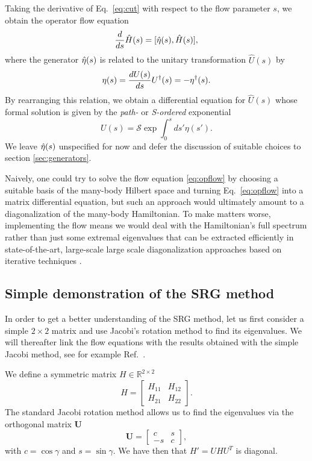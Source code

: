 Taking the derivative of Eq.~\eqref{eq:cut}
with respect to the flow parameter $s$, we obtain the operator flow equation
\begin{equation}\label{eq:opflow}
  \totd{}{s}\hat{H}(s) = \comm{\etaO(s)}{\hat{H}(s)},
\end{equation} 
where the generator $\hat{\eta}(s)$ is related to the unitary transformation $\hat{U}(s)$ by
\begin{equation}
  \eta(s)= \frac{d {U(s)}} {d {s}} U^{\dag}(s) = -\eta^{\dag}(s).
\end{equation}
By rearranging this relation, we obtain a differential equation for $\hat{U}(s)$ whose formal solution is given by the \emph{path-}
or \emph{S-ordered} exponential
\begin{equation}
  U(s) = \mathcal{S}\exp \int^s_0 ds' \eta(s').
\end{equation}
We leave $\hat{\eta}(s)$ unspecified for now and defer the discussion of suitable choices to section \ref{sec:generators}. 

Naively, one could try to solve the flow equation \eqref{eq:opflow} by
choosing a suitable basis of the many-body Hilbert space and turning
Eq.~\eqref{eq:opflow} into a matrix differential equation, but such an
approach would ultimately amount to a diagonalization of the many-body
Hamiltonian. To make matters worse, implementing the flow means we
would deal with the Hamiltonian's full spectrum rather than just some
extremal eigenvalues that can be extracted efficiently in
state-of-the-art, large-scale large scale diagonalization approaches based on iterative techniques
\cite{golubvaloan1996}.

\subsection{Simple demonstration of the SRG method}
In order to get a better understanding of the SRG method, let us first consider  
a simple $2\times 2$ matrix and use Jacobi's rotation method to find its eigenvalues. 
We will thereafter link the flow equations
with the results obtained with the simple Jacobi method, see for example Ref.~\cite{golubvanloan1996}.

We define a  symmetric matrix  $H\in {\mathbb{R}}^{2\times 2}$
\[ 
H = \begin{bmatrix} H_{11} & H_{12} \\ H_{21} & H_{22}\end{bmatrix}. 
\]
The standard Jacobi rotation method allows us to find the eigenvalues via the orthogonal matrix
$\mathbf{U}$ 
\[ 
\mathbf{U} = \begin{bmatrix} c & s \\ -s & c
\end{bmatrix}, 
\]
with $c = \cos \gamma$ and $s = \sin \gamma$. We have then that  $H' = UHU^T$ is diagonal. 


